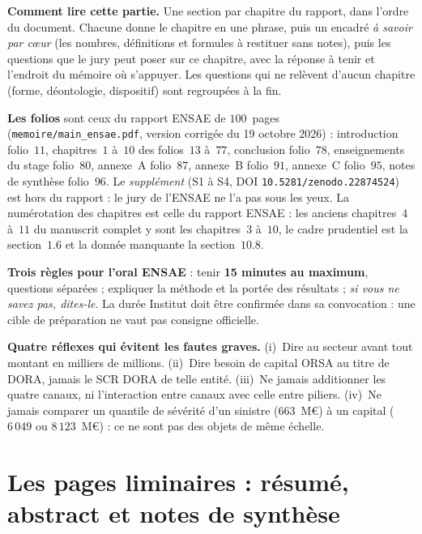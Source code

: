 \begin{cle}
\textbf{Comment lire cette partie.} Une section par chapitre du rapport, dans l'ordre du
document. Chacune donne le chapitre en une phrase, puis un encadré \emph{à savoir par c\oe ur}
(les nombres, définitions et formules à restituer sans notes), puis les questions que le jury
peut poser sur ce chapitre, avec la réponse à tenir et l'endroit du mémoire où s'appuyer. Les
questions qui ne relèvent d'aucun chapitre (forme, déontologie, dispositif) sont regroupées à
la fin.

\textbf{Les folios} sont ceux du rapport ENSAE de $100$~pages (\texttt{memoire/main\_ensae.pdf},
version corrigée du 19 octobre 2026) : introduction folio~$11$, chapitres~$1$ à~$10$ des folios~$13$ à~$77$,
conclusion folio~$78$, enseignements du stage folio~$80$, annexe~A folio~$87$, annexe~B folio~$91$,
annexe~C folio~$95$, notes de synthèse folio~$96$. Le \emph{supplément} (S1 à S4, DOI
\texttt{10.5281/zenodo.22874524}) est hors du rapport : le jury de l'ENSAE ne l'a pas sous les yeux.
La numérotation des chapitres est celle du rapport ENSAE : les anciens chapitres~$4$ à~$11$ du
manuscrit complet y sont les chapitres~$3$ à~$10$, le cadre prudentiel est la section~$1.6$ et la
donnée manquante la section~$10.8$.

\textbf{Trois règles pour l'oral ENSAE} : tenir \textbf{15 minutes au maximum}, questions séparées ;
expliquer la méthode et la portée des résultats ; \emph{si vous ne savez pas, dites-le}.
La durée Institut doit être confirmée dans sa convocation : une cible de préparation ne vaut pas consigne officielle.
\end{cle}

\begin{cle}
\textbf{Quatre réflexes qui évitent les fautes graves.} (i)~Dire \og au secteur\fg{} avant tout
montant en milliers de millions. (ii)~Dire \og besoin de capital ORSA au titre de DORA\fg{},
jamais \og le SCR DORA de telle entité\fg{}. (iii)~Ne jamais additionner les quatre canaux, ni
l'interaction entre canaux avec celle entre piliers. (iv)~Ne jamais comparer un quantile de
sévérité d'un sinistre ($663$~M\euro) à un capital ($6\,049$ ou $8\,123$~M\euro) : ce ne sont
pas des objets de même échelle.
\end{cle}

\section*{Les pages liminaires : résumé, abstract et notes de synthèse}

